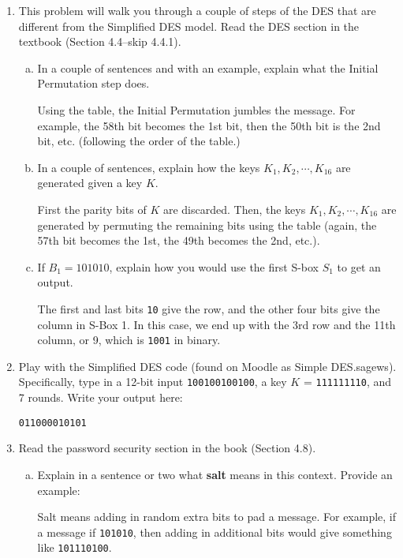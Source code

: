 \documentclass[12pt]{amsart}
\theoremstyle{plain}
\theoremstyle{definition}
\begin{document}
\begin{enumerate}[1.]
	\item This problem will walk you through a couple of steps of the DES that are different from the Simplified DES model.  Read the DES section in the textbook (Section 4.4--skip 4.4.1).
	\begin{enumerate}[a.]
		\item In a couple of sentences and with an example, explain what the Initial Permutation step does.
		\begin{framed}
		Using the table, the Initial Permutation jumbles the message.  For example, the 58th bit becomes the 1st bit, then the 50th bit is the 2nd bit, etc. (following the order of the table.)
		\end{framed}
		\item In a couple of sentences, explain how the keys $K_1, K_2, \cdots, K_{16}$ are generated given a key $K$.
		\begin{framed}
		First the parity bits of $K$ are discarded.  Then, the keys $K_1, K_2, \cdots, K_{16}$ are generated by permuting the remaining bits using the table (again, the 57th bit becomes the 1st, the 49th becomes the 2nd, etc.).
		\end{framed}
		\item If $B_1 = 101010$, explain how you would use the first S-box $S_1$ to get an output.
		\begin{framed}
		The first and last bits \texttt{10} give the row, and the other four bits give the column in S-Box 1.  In this case, we end up with the 3rd row and the 11th column, or 9, which is \texttt{1001} in binary.
		\end{framed}
	\end{enumerate}
	\item Play with the Simplified DES code (found on Moodle as Simple DES.sagews). Specifically, type in a 12-bit input \texttt{100100100100}, a key $K$ = \texttt{111111110}, and 7 rounds.  Write your output here:
		\begin{framed}
		\texttt{011000010101}
		\end{framed}
	\item Read the password security section in the book (Section 4.8).
		\begin{enumerate}[a.]
		\item Explain in a sentence or two what \textbf{salt} means in this context.  Provide an example:
		\begin{framed}
		Salt means adding in random extra bits to pad a message.  For example, if a message if \texttt{101010}, then adding in additional bits would give something like \texttt{101110100}.

\end{framed}
\end{enumerate}
\end{enumerate}
\end{document}
